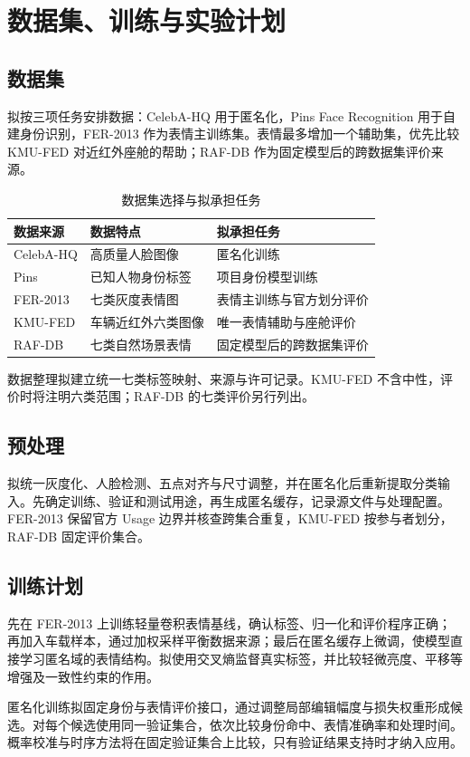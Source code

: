 \section{数据集、训练与实验计划}
\label{sec:experiment}
\subsection{数据集}
拟按三项任务安排数据：CelebA-HQ 用于匿名化，Pins Face Recognition 用于自建身份识别，FER-2013 作为表情主训练集。表情最多增加一个辅助集，优先比较 KMU-FED 对近红外座舱的帮助；RAF-DB 作为固定模型后的跨数据集评价来源。
\begin{table}[htbp]
\centering
\caption{数据集选择与拟承担任务}
\label{tab:datasets}
\begin{tabularx}{\linewidth}{@{}lXX@{}}
\toprule
数据来源 & 数据特点 & 拟承担任务\\
\midrule
CelebA-HQ & 高质量人脸图像 & 匿名化训练\\
Pins & 已知人物身份标签 & 项目身份模型训练\\
FER-2013 & 七类灰度表情图 & 表情主训练与官方划分评价\\
KMU-FED & 车辆近红外六类图像 & 唯一表情辅助与座舱评价\\
RAF-DB & 七类自然场景表情 & 固定模型后的跨数据集评价\\
\bottomrule
\end{tabularx}
\end{table}
数据整理拟建立统一七类标签映射、来源与许可记录。KMU-FED 不含中性，评价时将注明六类范围\cite{kmu2018}；RAF-DB 的七类评价另行列出\cite{li2017rafdb}。

\subsection{预处理}
拟统一灰度化、人脸检测、五点对齐与尺寸调整，并在匿名化后重新提取分类输入。先确定训练、验证和测试用途，再生成匿名缓存，记录源文件与处理配置。FER-2013 保留官方 Usage 边界并核查跨集合重复，KMU-FED 按参与者划分，RAF-DB 固定评价集合。

\subsection{训练计划}
先在 FER-2013 上训练轻量卷积表情基线，确认标签、归一化和评价程序正确；再加入车载样本，通过加权采样平衡数据来源；最后在匿名缓存上微调，使模型直接学习匿名域的表情结构。拟使用交叉熵监督真实标签，并比较轻微亮度、平移等增强及一致性约束的作用。

匿名化训练拟固定身份与表情评价接口，通过调整局部编辑幅度与损失权重形成候选。对每个候选使用同一验证集合，依次比较身份命中、表情准确率和处理时间。概率校准与时序方法将在固定验证集合上比较，只有验证结果支持时才纳入应用。

